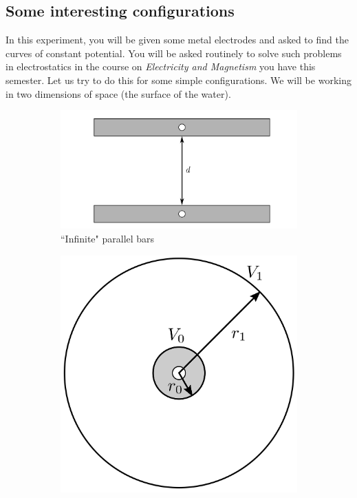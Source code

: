 \subsection*{Some interesting configurations}

In this experiment, you will be given some metal electrodes and asked to find the curves of constant potential. You will be asked routinely to solve such problems in electrostatics in the course on \textsl{Electricity and Magnetism} you have this semester. Let us try to do this for some simple configurations. We will be working in two dimensions of space (the surface of the water). 

\begin{figure}[!htb]
\captionsetup[subfigure]{justification=centering}
\centering
        \begin{subfigure}[b]{0.6\textwidth}
        \centering
                \includegraphics[scale=0.5]{figs/equipotential-curves/equipotential-parallel-plates.png}
                \caption{ ``Infinite" parallel bars}
                \label{fig:parallel-plates}
        \end{subfigure}\hfill
        \begin{subfigure}[b]{0.4\textwidth}
        \centering
                \includegraphics[scale=0.5]{figs/equipotential-curves/equipotential-concentric-cylinders.png}

\end{subfigure}
\end{figure}
